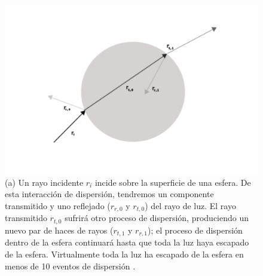 \documentclass[10pt,aspectratio=1610,compress,dvipsnames]{beamer}
\begin{document}
\begin{frame}
{\begin{figure}
    \centering
    \includegraphics[scale=0.16]{beadrayoptics2.png}
    \caption{(a) Un rayo incidente $r_i$ incide sobre la superficie de una esfera. De esta interacción de dispersión, tendremos un componente transmitido y uno reflejado ($r_{r,0}$ y $r_{t,0}$) del rayo de luz. El rayo transmitido $r_{t,0}$ sufrirá otro proceso de dispersión, produciendo un nuevo par de haces de rayos ($r_{t,1}$ y $r_{r,1}$); el proceso de dispersión dentro de la esfera continuará hasta que toda la luz haya escapado de la esfera. Virtualmente toda la luz ha escapado de la esfera en menos de 10 eventos de dispersión \cite{jones2015optical}.}
    \label{bead_optics}
\end{figure}
}



\end{frame}
\end{document}
